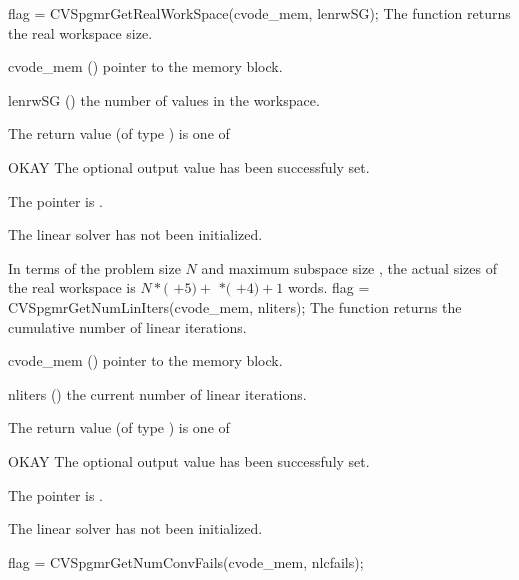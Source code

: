 {}
{
  flag = CVSpgmrGetRealWorkSpace(cvode\_mem, lenrwSG);
}
{
  The function  returns the
  {\cvspgmr} real workspace size.
}
{
  \begin{args}
  \item[cvode\_mem] ()
    pointer to the {\cvodes} memory block.
  \item[lenrwSG] ()
    the number of  values in the {\cvspgmr} workspace.
  \end{args}
}
{
  The return value  (of type ) is one of
  \begin{args}
  \item[OKAY] 
    The optional output value has been successfuly set.
  \item[\Id{LIN\_NO\_MEM}]
    The  pointer is .
  \item[\Id{LIN\_NO\_LMEM}]
    The {\cvspgmr} linear solver has not been initialized.
  \end{args}
}
{
  In terms of the problem size $N$ and maximum subspace size , 
  the actual sizes of the real workspace is
  $N*($  $+ 5) +$  $*($  $ + 4) + 1$  words.
}
{
  flag = CVSpgmrGetNumLinIters(cvode\_mem, nliters);
}
{
  The function  returns the
  cumulative number of linear iterations.
}
{
  \begin{args}
  \item[cvode\_mem] ()
    pointer to the {\cvodes} memory block.
  \item[nliters] ()
    the current number of linear iterations.
  \end{args}
}
{
  The return value  (of type ) is one of
  \begin{args}
  \item[OKAY] 
    The optional output value has been successfuly set.
  \item[\Id{LIN\_NO\_MEM}]
    The  pointer is .
  \item[\Id{LIN\_NO\_LMEM}]
    The {\cvspgmr} linear solver has not been initialized.
  \end{args}
}
{}
{
  flag = CVSpgmrGetNumConvFails(cvode\_mem, nlcfails);
}
